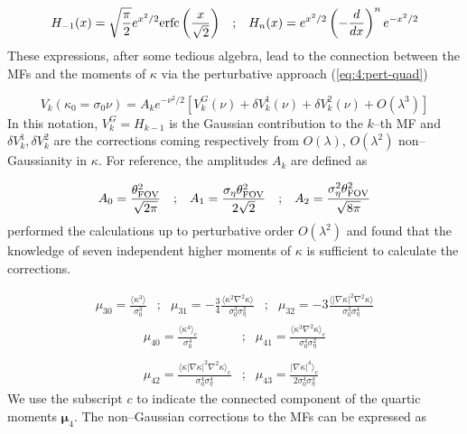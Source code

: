 \begin{equation}
\label{eq:4:hermite}
\begin{matrix}
\displaystyle H_{-1}(x) = \sqrt{\frac{\pi}{2}}e^{x^2/2}{\rm erfc}\left(\frac{x}{\sqrt{2}}\right) & ; & \displaystyle H_n(x) = e^{x^2/2}\left(-\frac{d}{dx}\right)^n e^{-x^2/2}
\end{matrix}
\end{equation}
%
These expressions, after some tedious algebra, lead to the connection between the MFs and the moments of $\kappa$ via the perturbative approach (\ref{eq:4:pert-quad})

\begin{equation}
\label{eq:4:Vk-pert}
V_k(\kappa_0=\sigma_0\nu) = A_k e^{-\nu^2/2}\left[V_k^G(\nu)+\delta V^1_k(\nu) + \delta V^2_k(\nu) + O(\lambda^3)\right] 
\end{equation}
%
In this notation, $V_k^G=H_{k-1}$ is the Gaussian contribution to the $k$--th MF and $\delta V^1_k,\delta V^2_k$ are the corrections coming respectively from $O(\lambda)$, $O(\lambda^2)$ non--Gaussianity in $\kappa$. For reference, the amplitudes $A_k$ are defined as 

\begin{equation}
\label{eq:4:amplitude}
\begin{matrix}
\displaystyle A_0 = \frac{\theta_{\rm FOV}^2}{\sqrt{2\pi}} & ; & \displaystyle A_1 = \frac{\sigma_\eta\theta_{\rm FOV}^2}{2\sqrt{2}} & ; & \displaystyle A_2 = \frac{\sigma_\eta^2\theta^2_{\rm FOV}}{\sqrt{8\pi}}
\end{matrix}
\end{equation}
%
\citep{Munshi12} performed the calculations up to perturbative order $O(\lambda^2)$ and found that the knowledge of seven independent higher moments of $\kappa$ is sufficient to calculate the corrections. 

\begin{equation}
\label{eq:4:skew-dimensionless}
\begin{matrix}
\displaystyle \mu_{30} = \frac{\langle\kappa^3\rangle}{\sigma_0^3} & ; & \displaystyle \mu_{31} = -\frac{3}{4} \frac{\langle\kappa^2\nabla^2\kappa\rangle}{\sigma_0^3\sigma_\eta^2} & ; & \displaystyle \mu_{32} = -3 \frac{\langle\vert\nabla\kappa\vert^2\nabla^2\kappa\rangle}{\sigma_0^3\sigma_\eta^4}
\end{matrix}
\end{equation}
%
\begin{equation}
\label{eq:4:kurt-dimensionless}
\begin{matrix}
\displaystyle \mu_{40} = \frac{\langle\kappa^4\rangle_c}{\sigma_0^4} & ; & \displaystyle \mu_{41} = \frac{\langle\kappa^3\nabla^2\kappa\rangle_c}{\sigma_0^4\sigma_\eta^2} \\ \\ 
\displaystyle \mu_{42} = \frac{\langle\kappa\vert\nabla\kappa\vert^2\nabla^2\kappa\rangle_c}{\sigma_0^4\sigma_\eta^4} & ; & \displaystyle \mu_{43} = \frac{\vert\nabla\kappa\vert^4\rangle_c}{2\sigma_0^4\sigma_\eta^4}
\end{matrix}
\end{equation}
%
We use the subscript $c$ to indicate the connected component of the quartic moments $\pmb{\mu}_4$. The non--Gaussian corrections to the MFs can be expressed as 


